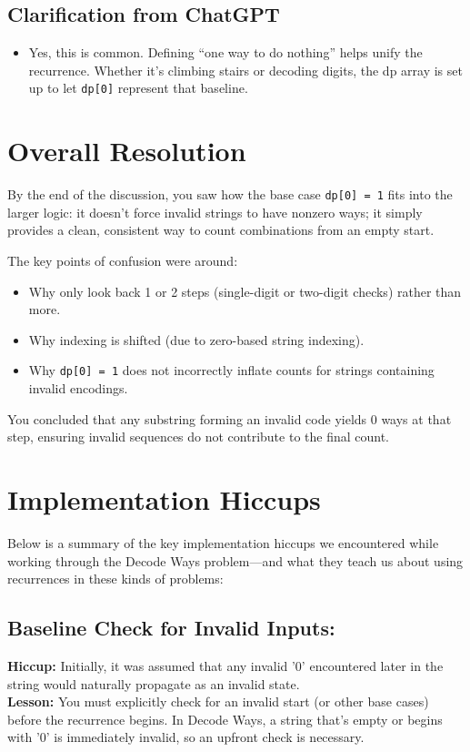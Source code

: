 \documentclass[12pt]{article}
\begin{document}
\subsection{Clarification from ChatGPT}
\begin{itemize}[leftmargin=*, label={--}]
    \item Yes, this is common. Defining ``one way to do nothing'' helps unify the recurrence. Whether it’s climbing stairs or decoding digits, the dp array is set up to let \texttt{dp[0]} represent that baseline.
\end{itemize}

\section{Overall Resolution}
By the end of the discussion, you saw how the base case \texttt{dp[0] = 1} fits into the larger logic: it doesn’t force invalid strings to have nonzero ways; it simply provides a clean, consistent way to count combinations from an empty start.

The key points of confusion were around:
\begin{itemize}[leftmargin=*, label={--}]
    \item Why only look back 1 or 2 steps (single-digit or two-digit checks) rather than more.
    \item Why indexing is shifted (due to zero-based string indexing).
    \item Why \texttt{dp[0] = 1} does not incorrectly inflate counts for strings containing invalid encodings.
\end{itemize}

You concluded that any substring forming an invalid code yields 0 ways at that step, ensuring invalid sequences do not contribute to the final count.

\section{Implementation Hiccups}

Below is a summary of the key implementation hiccups we encountered while working through the Decode Ways problem---and what they teach us about using recurrences in these kinds of problems:

\subsection*{Baseline Check for Invalid Inputs:}
\textbf{Hiccup:} Initially, it was assumed that any invalid '0' encountered later in the string would naturally propagate as an invalid state.\\
\textbf{Lesson:} You must explicitly check for an invalid start (or other base cases) before the recurrence begins. In Decode Ways, a string that’s empty or begins with '0' is immediately invalid, so an upfront check is necessary.
\end{document}
